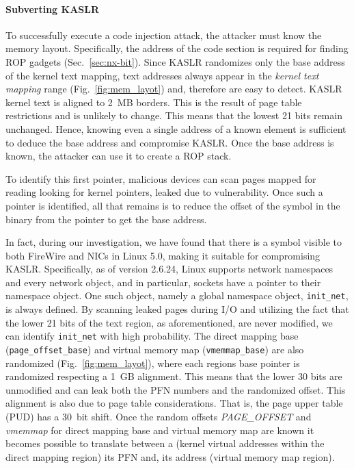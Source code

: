 \paragraph{Subverting KASLR}
To successfully execute a code injection attack, the attacker must know the memory layout. Specifically, the address of the code section is required for finding ROP gadgets (Sec.~\ref{sec:nx-bit}). 
Since KASLR randomizes only the base address of the kernel text mapping, text addresses always appear in the \textit{kernel text mapping} range (Fig.~\ref{fig:mem_layot}) and, therefore are easy to detect. KASLR kernel text is aligned to 2~MB borders. This is the result of page table restrictions and is unlikely to change. This means that the lowest 21 bits remain unchanged. Hence, knowing even a single address of a known element is sufficient to deduce the base address and compromise KASLR. Once the base address is known, the attacker can use it to create a ROP stack.

To identify this first pointer, malicious devices can scan pages mapped for reading looking for kernel pointers, leaked due to \subpage{} vulnerability. Once such a pointer is identified, all that remains is to reduce the offset of the symbol in the binary from the pointer to get the base address.

In fact, during our investigation, we have found that there is a symbol visible to both FireWire and NICs in Linux 5.0, making it suitable for compromising KASLR. Specifically, as of version 2.6.24, Linux supports network namespaces and every network object, and in particular, sockets have a pointer to their namespace object. One such object, namely a global namespace object, \texttt{init\_net}, is always defined. By scanning leaked pages during I/O and utilizing the fact that the lower 21 bits of the text region, as aforementioned, are never modified, we can identify \texttt{init\_net} with high probability.
The direct mapping base (\texttt{page\_offset\_base}) and virtual memory map (\texttt{vmemmap\_base}) are also randomized (Fig.~\ref{fig:mem_layot}), where each regions base pointer is randomized respecting a 1~GB alignment. This means that the lower 30 bits are unmodified and can leak both the PFN numbers and the randomized offset. This alignment is also due to page table considerations. That is, the page upper table (PUD) has a 30~bit shift. Once the random offsets \textit{PAGE\_OFFSET} and \textit{vmemmap} for direct mapping base and virtual memory map are known it becomes possible to translate between a \kva{} (kernel virtual addresses within the direct mapping region) its PFN and, its \page{} address (virtual memory map region).

